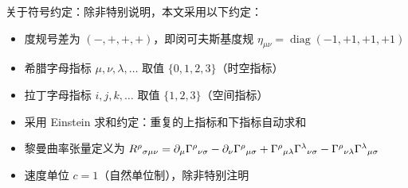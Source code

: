 关于符号约定：除非特别说明，本文采用以下约定：
\begin{itemize}
    \item 度规号差为 $(-,+,+,+)$，即闵可夫斯基度规 $\eta_{\mu\nu} = \operatorname{diag}(-1, +1, +1, +1)$
    \item 希腊字母指标 $\mu,\nu,\lambda,\ldots$ 取值 $\{0,1,2,3\}$（时空指标）
    \item 拉丁字母指标 $i,j,k,\ldots$ 取值 $\{1,2,3\}$（空间指标）
    \item 采用 Einstein 求和约定：重复的上指标和下指标自动求和
    \item 黎曼曲率张量定义为 $R^\rho{}_{\sigma\mu\nu} = \partial_\mu \Gamma^\rho{}_{\nu\sigma} - \partial_\nu \Gamma^\rho{}_{\mu\sigma} + \Gamma^\rho{}_{\mu\lambda}\Gamma^\lambda{}_{\nu\sigma} - \Gamma^\rho{}_{\nu\lambda}\Gamma^\lambda{}_{\mu\sigma}$
    \item 速度单位 $c=1$（自然单位制），除非特别注明
\end{itemize}
